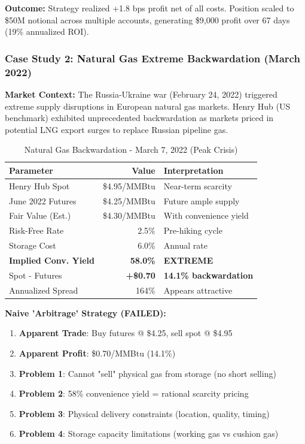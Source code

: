\documentclass[12pt,a4paper]{article}
\begin{document}
\textbf{Outcome:} Strategy realized +1.8 bps profit net of all costs. Position scaled to \$50M notional across multiple accounts, generating \$9,000 profit over 67 days (19\% annualized ROI).

\subsubsection{Case Study 2: Natural Gas Extreme Backwardation (March 2022)}

\textbf{Market Context:} The Russia-Ukraine war (February 24, 2022) triggered extreme supply disruptions in European natural gas markets. Henry Hub (US benchmark) exhibited unprecedented backwardation as markets priced in potential LNG export surges to replace Russian pipeline gas.

\begin{table}[H]
\centering
\caption{Natural Gas Backwardation - March 7, 2022 (Peak Crisis)}
\label{tab:case_natgas}
\begin{tabular}{@{}lrl@{}}
\toprule
\textbf{Parameter} & \textbf{Value} & \textbf{Interpretation} \\
\midrule
Henry Hub Spot & \$4.95/MMBtu & Near-term scarcity \\
June 2022 Futures & \$4.25/MMBtu & Future ample supply \\
Fair Value (Est.) & \$4.30/MMBtu & With convenience yield \\
\midrule
Risk-Free Rate & 2.5\% & Pre-hiking cycle \\
Storage Cost & 6.0\% & Annual rate \\
\textbf{Implied Conv. Yield} & \textbf{58.0\%} & \textbf{EXTREME} \\
\midrule
Spot - Futures & \textbf{+\$0.70} & \textbf{14.1\% backwardation} \\
Annualized Spread & 164\% & Appears attractive \\
\bottomrule
\end{tabular}
\end{table}

\textbf{Naive 'Arbitrage' Strategy (FAILED):}

\begin{enumerate}
    \item \textbf{Apparent Trade}: Buy futures @ \$4.25, sell spot @ \$4.95
    \item \textbf{Apparent Profit}: \$0.70/MMBtu (14.1\%)
    \item \textbf{Problem 1}: Cannot "sell" physical gas from storage (no short selling)
    \item \textbf{Problem 2}: 58\% convenience yield = rational scarcity pricing
    \item \textbf{Problem 3}: Physical delivery constraints (location, quality, timing)
    \item \textbf{Problem 4}: Storage capacity limitations (working gas vs cushion gas)
\end{enumerate}
\end{document}

